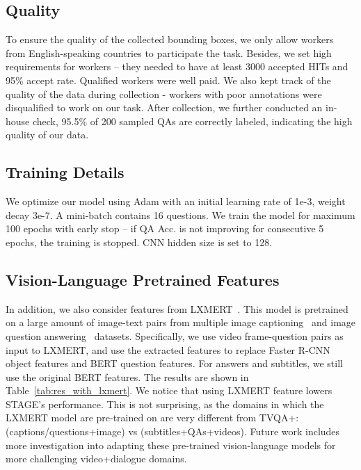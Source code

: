 \documentclass[11pt,a4paper]{article}
\begin{document}
\subsection{Quality}
To ensure the quality of the collected bounding boxes, we only allow workers from English-speaking countries to participate the task. Besides, we set high requirements for workers -- they needed to have at least 3000 accepted HITs and 95\% accept rate. Qualified workers were well paid. We also kept track of the quality of the data during collection - workers with poor annotations were disqualified to work on our task. 
After collection, we further conducted an in-house check, 95.5\% of 200 sampled QAs are correctly labeled, indicating the high quality of our data.

\subsection{Training Details}
We optimize our model using Adam with an initial learning rate of 1e-3, weight decay 3e-7.
A mini-batch contains 16 questions. We train the model for maximum 100 epochs with early stop -- if QA Acc. is not improving for consecutive 5 epochs, the training is stopped. CNN hidden size is set to 128. 


\begin{table}[t]
\centering
\small
{}
\caption{TVQA+ test set results with LXMERT.}
\label{tab:res_with_lxmert}
\end{table}


 
\subsection{Vision-Language Pretrained Features}
In addition, we also consider features from LXMERT~\cite{tan2019lxmert}. 
This model is pretrained on a large amount of image-text pairs from multiple image captioning~\cite{lin2014microsoft,krishna2017visual} and image question answering~\cite{goyal2017making,hudson2019gqa,zhu2016cvpr} datasets. 
Specifically, we use video frame-question pairs as input to LXMERT, and use the extracted features to replace Faster R-CNN object features and BERT question features.
For answers and subtitles, we still use the original BERT features. 
The results are shown in Table~\ref{tab:res_with_lxmert}.
We notice that using LXMERT feature lowers STAGE's performance.
This is not surprising, as the domains in which the LXMERT model are pre-trained on are very different from TVQA+: (captions/questions+image) vs (subtitles+QAs+videos). Future work includes more investigation into adapting these pre-trained vision-language models for more challenging video+dialogue domains.
\end{document}
